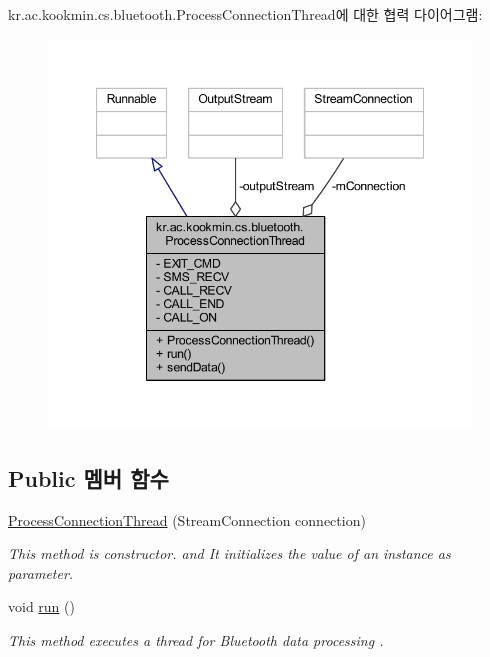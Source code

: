 kr.\+ac.\+kookmin.\+cs.\+bluetooth.\+Process\+Connection\+Thread에 대한 협력 다이어그램\+:\nopagebreak
\begin{figure}[H]
\begin{center}
\leavevmode
\includegraphics[width=347pt]{classkr_1_1ac_1_1kookmin_1_1cs_1_1bluetooth_1_1_process_connection_thread__coll__graph}
\end{center}
\end{figure}
\subsection*{Public 멤버 함수}
\begin{DoxyCompactItemize}
\item 
\hyperlink{classkr_1_1ac_1_1kookmin_1_1cs_1_1bluetooth_1_1_process_connection_thread_af957b60a81b2ed39d0f92e4fdfc31fc1}{Process\+Connection\+Thread} (Stream\+Connection connection)
\begin{DoxyCompactList}\small\item\em This method is constructor. and It initializes the value of an instance as parameter. \end{DoxyCompactList}\item 
void \hyperlink{classkr_1_1ac_1_1kookmin_1_1cs_1_1bluetooth_1_1_process_connection_thread_ab6a22c28ef62aefa7ab96d929aebf3c2}{run} ()
\begin{DoxyCompactList}\small\item\em This method executes a thread for Bluetooth data processing . \end{DoxyCompactList}\end{DoxyCompactItemize}
